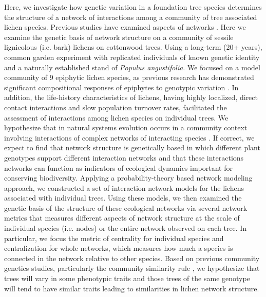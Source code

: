 \documentclass[11pt,twocolumn,twoside,lineno]{pnas-new}
\begin{document}
Here, we investigate how genetic variation in a foundation tree
species determines the structure of a network of interactions among a
community of tree associated lichen species. Previous studies have
examined aspects of networks \citep{Barbour2019TraitCommunities}. Here
we examine the genetic basis of network structure on a community of
sessile lignicolous (i.e. bark) lichens on cottonwood trees. Using a
long-term (20+ years), common garden experiment with replicated
individuals of known genetic identity and a naturally established
stand of \textit{Populus angustifolia}. We focused on a model
community of 9 epiphytic lichen species, as previous research has
demonstrated significant compositional responses of epiphytes to
genotypic variation \citep{Winfree2011, Zytynska2011}. In addition,
the life-history characteristics of lichens, having highly localized,
direct contact interactions and slow population turnover rates,
facilitated the assessment of interactions among lichen species on
individual trees. We hypothesize that in natural systems evolution
occurs in a community context involving interactions of complex
networks of interacting species \cite{Lau2015a, Keith2017,
  Thompson2013, Bascompte2006}.  If correct, we expect to find that
network structure is genetically based in which different plant
genotypes support different interaction networks and that these
interactions networks can function as indicators of ecological
dynamics important for conserving biodiversity.  Applying a
probability-theory based network modeling approach, we constructed a
set of interaction network models for the lichens associated with
individual trees. Using these models, we then examined the genetic
basis of the structure of these ecological networks via several
network metrics that measures different aspects of network structure
at the scale of individual species (i.e. nodes) or the entire network
observed on each tree. In particular, we focus the metric of
centrality for individual species and centralization for whole
networks, which measures how much a species is connected in the
network relative to other species. Based on previous community
genetics studies, particularly the community similarity rule
\citep{Bangert2006}, we hypothesize that trees will vary in some
phenotypic traits and those trees of the same genotype will tend to
have similar traits leading to similarities in lichen network
structure.
\end{document}
